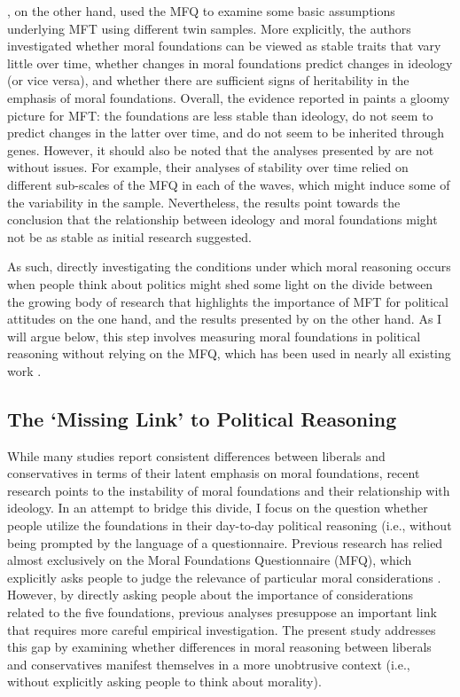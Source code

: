\documentclass[12pt]{article}
\begin{document}
\citet{smith2016intuitive}, on the other hand, used the MFQ to examine some basic assumptions underlying MFT using different twin samples. More explicitly, the authors investigated whether moral foundations can be viewed as stable traits that vary little over time, whether changes in moral foundations predict changes in ideology (or vice versa), and whether there are sufficient signs of heritability in the emphasis of moral foundations. Overall, the evidence reported in \citet{smith2016intuitive} paints a gloomy picture for MFT: the foundations are less stable than ideology, do not seem to predict changes in the latter over time, and do not seem to be inherited through genes. However, it should also be noted that the analyses presented by \citet{smith2016intuitive} are not without issues. For example, their analyses of stability over time relied on different sub-scales of the MFQ in each of the waves, which might induce some of the variability in the sample. Nevertheless, the results point towards the conclusion that the relationship between ideology and moral foundations might not be as stable as initial research suggested.

As such, directly investigating the conditions under which moral reasoning occurs when people think about politics might shed some light on the divide between the growing body of research that highlights the importance of MFT for political attitudes on the one hand, and the results presented by \citet{smith2016intuitive} on the other hand. As I will argue below, this step involves measuring moral foundations in political reasoning without relying on the MFQ, which has been used in nearly all existing work \citep[but see][]{clifford2014linking}.


\subsection{The `Missing Link' to Political Reasoning}

While many studies report consistent differences between liberals and conservatives in terms of their latent emphasis on moral foundations, recent research points to the instability of moral foundations and their relationship with ideology. In an attempt to bridge this divide, I focus on the question whether people utilize the foundations in their day-to-day political reasoning (i.e., without being prompted by the language of a questionnaire. Previous research has relied almost exclusively on the Moral Foundations Questionnaire (MFQ), which explicitly asks people to judge the relevance of particular moral considerations \citep[e.g.][]{graham2011mapping}. However, by directly asking people about the importance of considerations related to the five foundations, previous analyses presuppose an important link that requires more careful empirical investigation. The present study addresses this gap by examining whether differences in moral reasoning between liberals and conservatives manifest themselves in a more unobtrusive context (i.e., without explicitly asking people to think about morality). 
\end{document}
